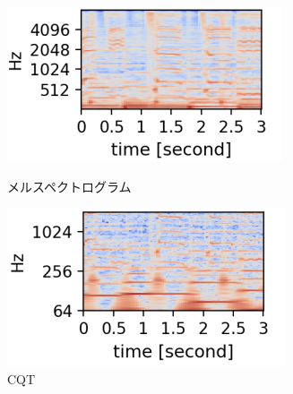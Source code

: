 \begin{figure}[b]
\centering
\begin{minipage}[b]{0.48\columnwidth}
\centering
\includegraphics[width=\columnwidth]{figure/mel.png}
\caption{メルスペクトログラム}
\label{fig:mel}
\end{minipage}
\begin{minipage}[b]{0.48\columnwidth}
\centering
\includegraphics[width=\columnwidth]{figure/cqt.png}
\caption{CQT}
\label{fig:cqt}
\end{minipage}
\end{figure}
    